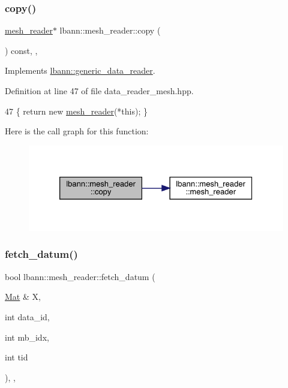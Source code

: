 \subsubsection{\texorpdfstring{copy()}{copy()}}
{\footnotesize\ttfamily \hyperlink{classlbann_1_1mesh__reader}{mesh\+\_\+reader}$\ast$ lbann\+::mesh\+\_\+reader\+::copy (\begin{DoxyParamCaption}{ }\end{DoxyParamCaption}) const\hspace{0.3cm}{\ttfamily [inline]}, {\ttfamily [override]}, {\ttfamily [virtual]}}



Implements \hyperlink{classlbann_1_1generic__data__reader_a208ba1223e7aaa75e94b728501f12f86}{lbann\+::generic\+\_\+data\+\_\+reader}.



Definition at line 47 of file data\+\_\+reader\+\_\+mesh.\+hpp.


\begin{DoxyCode}
47 \{ \textcolor{keywordflow}{return} \textcolor{keyword}{new} \hyperlink{classlbann_1_1mesh__reader_aa101fb0ec314baedda7b9453de1933b6}{mesh\_reader}(*\textcolor{keyword}{this}); \}
\end{DoxyCode}
Here is the call graph for this function\+:\nopagebreak
\begin{figure}[H]
\begin{center}
\leavevmode
\includegraphics[width=326pt]{classlbann_1_1mesh__reader_ae89964739df2b688f56081292e6e24e1_cgraph}
\end{center}
\end{figure}
\mbox{\label{classlbann_1_1mesh__reader_a0ed2aa6d5ec6509c15d0cf7d9657df29}} 
\subsubsection{\texorpdfstring{fetch\+\_\+datum()}{fetch\_datum()}}
{\footnotesize\ttfamily bool lbann\+::mesh\+\_\+reader\+::fetch\+\_\+datum (\begin{DoxyParamCaption}\item[{\hyperlink{base_8hpp_a68f11fdc31b62516cb310831bbe54d73}{Mat} \&}]{X,  }\item[{int}]{data\+\_\+id,  }\item[{int}]{mb\+\_\+idx,  }\item[{int}]{tid }\end{DoxyParamCaption})\hspace{0.3cm}{\ttfamily [override]}, {\ttfamily [protected]}, {\ttfamily [virtual]}}

